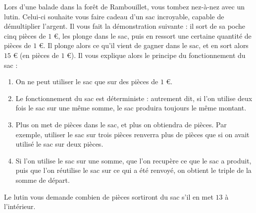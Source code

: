 \documentclass{exam}
\begin{document}
\begin{questions}
\vspace{0.5cm}
Lors d'une balade dans la forêt de Rambouillet, vous tombez nez-à-nez avec un lutin. Celui-ci souhaite vous faire cadeau d'un sac incroyable, capable de démultiplier l'argent. Il vous fait la démonstration suivante : il sort de sa poche cinq pièces de $1$ \euro{}, les plonge dans le sac, puis en ressort une certaine quantité de pièces de $1$ \euro{}. Il plonge alors ce qu'il vient de gagner dans le sac, et en sort alors $15$ \euro{} (en pièces de $1$ \euro). Il vous explique alors le principe du fonctionnement du sac :
\begin{enumerate}
\item On ne peut utiliser le sac que sur des pièces de $1$ \euro.
\item Le fonctionnement du sac est déterministe : autrement dit, si l'on utilise deux fois le sac sur une même somme, le sac produira toujours le même montant.
\item Plus on met de pièces dans le sac, et plus on obtiendra de pièces. Par exemple, utiliser le sac sur trois pièces renverra plus de pièces que si on avait utilisé le sac sur deux pièces.
\item Si l'on utilise le sac sur une somme, que l'on recupère ce que le sac a produit, puis que l'on réutilise le sac sur ce qui a été renvoyé, on obtient le triple de la somme de départ.
\end{enumerate}
Le lutin vous demande combien de pièces sortiront du sac s'il en met $13$ à l'intérieur.


\end{questions}
\end{document}
